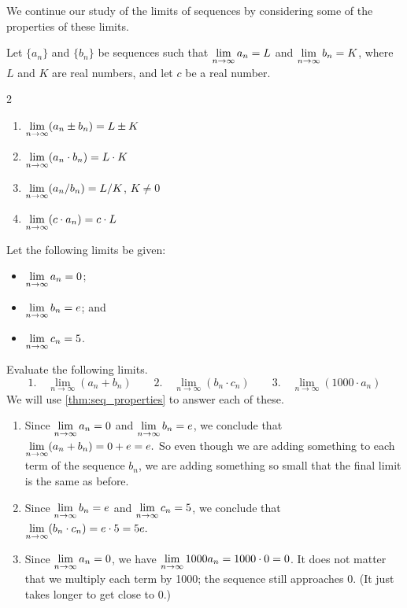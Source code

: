 We continue our study of the limits of sequences by considering some of the properties of these limits.

\begin{theorem}\label{thm:seq_properties}%
Let $\{a_n\}$ and $\{b_n\}$ be sequences such that $\displaystyle \lim_{n\to\infty} a_n = L$ and $\displaystyle \lim_{n\to\infty} b_n = K$, where $L$ and $K$ are real numbers, and let $c$ be a real number.
\begin{multicols}{2}
\begin{enumerate}
\item		$\displaystyle \lim_{n\to\infty} (a_n\pm b_n) = L\pm K$
\item		$\displaystyle \lim_{n\to\infty} (a_n\cdot b_n) = L\cdot K$
\item		$\displaystyle \lim_{n\to\infty} (a_n/b_n) = L/K$, $K\neq 0$
\item		$\displaystyle \lim_{n\to\infty} (c\cdot a_n) = c\cdot L$
\end{enumerate}
\end{multicols}
\end{theorem}

\begin{example}\label{ex_seq6}%
Let the following limits be given:
\begin{itemize}
\item	 	$\displaystyle \lim_{n\to\infty} a_n = 0$;
\item		$\displaystyle \lim_{n\to\infty} b_n = e$; and
\item	  $\displaystyle \lim_{n\to\infty} c_n = 5$.
\end{itemize}
Evaluate the following limits.
\[
 \text{1.}\quad\lim_{n\to\infty} (a_n+b_n)\qquad
 \text{2.}\quad\lim_{n\to\infty} (b_n\cdot c_n)\qquad
 \text{3.}\quad\lim_{n\to\infty} (1000\cdot a_n)
\]
\solution
We will use \autoref{thm:seq_properties} to answer each of these.
\begin{enumerate} 
\item		Since $\displaystyle \lim_{n\to\infty} a_n = 0$ and $\displaystyle \lim_{n\to\infty} b_n = e$, we conclude that $\displaystyle \lim_{n\to\infty} (a_n+b_n) = 0+e = e.$ So even though we are adding something to each term of the sequence $b_n$, we are adding something so small that the final limit is the same as before.

\item		Since $\displaystyle \lim_{n\to\infty} b_n = e$ and $\displaystyle \lim_{n\to\infty} c_n = 5$, we conclude that $\displaystyle \lim_{n\to\infty} (b_n\cdot c_n) = e\cdot 5 = 5e.$

\item		Since $\displaystyle \lim_{n\to\infty} a_n = 0$, we have $\displaystyle \lim_{n\to\infty} 1000a_n =1000\cdot 0 = 0$. It does not matter that we multiply each term by 1000; the sequence still approaches 0. (It just takes longer to get close to 0.)
\end{enumerate}
\end{example}

